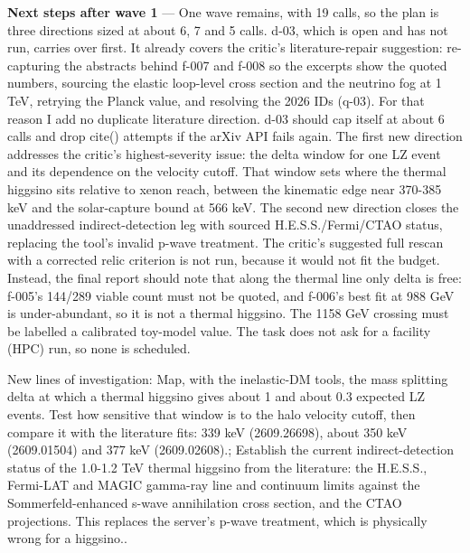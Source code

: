\documentclass[11pt,a4paper]{article}
\begin{document}
\textbf{Next steps after wave 1} --- One wave remains, with 19 calls, so the plan is three directions sized at about 6, 7 and 5 calls. d-03, which is open and has not run, carries over first. It already covers the critic's literature-repair suggestion: re-capturing the abstracts behind f-007 and f-008 so the excerpts show the quoted numbers, sourcing the elastic loop-level cross section and the neutrino fog at 1 TeV, retrying the Planck value, and resolving the 2026 IDs (q-03). For that reason I add no duplicate literature direction. d-03 should cap itself at about 6 calls and drop cite() attempts if the arXiv API fails again. The first new direction addresses the critic's highest-severity issue: the delta window for one LZ event and its dependence on the velocity cutoff. That window sets where the thermal higgsino sits relative to xenon reach, between the kinematic edge near 370-385 keV and the solar-capture bound at 566 keV. The second new direction closes the unaddressed indirect-detection leg with sourced H.E.S.S./Fermi/CTAO status, replacing the tool's invalid p-wave treatment. The critic's suggested full rescan with a corrected relic criterion is not run, because it would not fit the budget. Instead, the final report should note that along the thermal line only delta is free: f-005's 144/289 viable count must not be quoted, and f-006's best fit at 988 GeV is under-abundant, so it is not a thermal higgsino. The 1158 GeV crossing must be labelled a calibrated toy-model value. The task does not ask for a facility (HPC) run, so none is scheduled.

New lines of investigation: Map, with the inelastic-DM tools, the mass splitting delta at which a thermal higgsino gives about 1 and about 0.3 expected LZ events. Test how sensitive that window is to the halo velocity cutoff, then compare it with the literature fits: 339 keV (2609.26698), about 350 keV (2609.01504) and 377 keV (2609.02608).; Establish the current indirect-detection status of the 1.0-1.2 TeV thermal higgsino from the literature: the H.E.S.S., Fermi-LAT and MAGIC gamma-ray line and continuum limits against the Sommerfeld-enhanced s-wave annihilation cross section, and the CTAO projections. This replaces the server's p-wave treatment, which is physically wrong for a higgsino..
\end{document}
